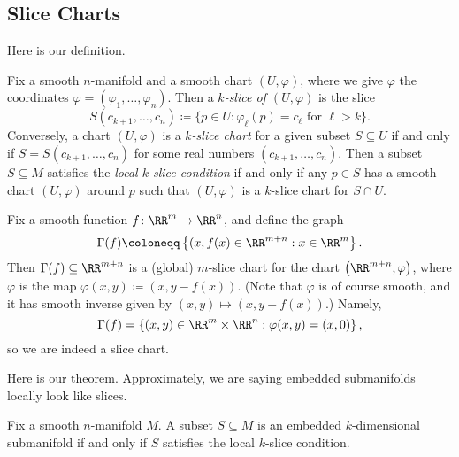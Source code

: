 \documentclass[../notes.tex]{subfiles}
\begin{document}
\subsection{Slice Charts}
Here is our definition.
\begin{definition}[slice]
	Fix a smooth $n$-manifold and a smooth chart $(U,\varphi)$, where we give $\varphi$ the coordinates $\varphi=(\varphi_1,\ldots,\varphi_n)$. Then a \textit{$k$-slice of $(U,\varphi)$} is the slice
	\[S(c_{k+1},\ldots,c_n)\coloneqq\{p\in U:\varphi_\ell(p)=c_\ell\text{ for }\ell>k\}.\]
	Conversely, a chart $(U,\varphi)$ is a \textit{$k$-slice chart} for a given subset $S\subseteq U$ if and only if $S=S(c_{k+1},\ldots,c_n)$ for some real numbers $(c_{k+1},\ldots,c_n)$. Then a subset $S\subseteq M$ satisfies the \textit{local $k$-slice condition} if and only if any $p\in S$ has a smooth chart $(U,\varphi)$ around $p$ such that $(U,\varphi)$ is a $k$-slice chart for $S\cap U$.
\end{definition}
\begin{example}
	Fix a smooth function $f\colon\RR^m\to\RR^n$, and define the graph
	\[\Gamma(f)\coloneqq\left\{(x,f(x)\in\RR^{m+n}:x\in\RR^m\right\}.\]
	Then $\Gamma(f)\subseteq\RR^{m+n}$ is a (global) $m$-slice chart for the chart $\left(\RR^{m+n},\varphi\right)$, where $\varphi$ is the map $\varphi(x,y)\coloneqq(x,y-f(x))$. (Note that $\varphi$ is of course smooth, and it has smooth inverse given by $(x,y)\mapsto(x,y+f(x))$.) Namely,
	\[\Gamma(f)=\left\{(x,y)\in\RR^m\times\RR^n:\varphi(x,y)=(x,0)\right\},\]
	so we are indeed a slice chart.
\end{example}
Here is our theorem. Approximately, we are saying embedded submanifolds locally look like slices.
\begin{theorem}[Slice] \label{thm:slice}
	Fix a smooth $n$-manifold $M$. A subset $S\subseteq M$ is an embedded $k$-dimensional submanifold if and only if $S$ satisfies the local $k$-slice condition.
\end{theorem}
\end{document}
